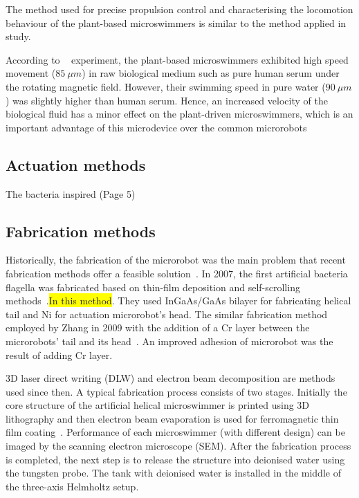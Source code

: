 \documentclass[12pt,a4paper,titlepage]{report}
\newcommand{\hilight}[1]{\colorbox{yellow}{#1}}
\begin{document}
The method used for precise propulsion control and characterising the locomotion behaviour of the 
plant-based microswimmers is similar to the method applied in \citeauthor{gao2013bioinspired} study.

According to \citeauthor{gao2013bioinspired} ~\citep{gao2013bioinspired} experiment, the plant-based 
microswimmers exhibited high speed movement ($85~\mu m$) in raw biological medium such as 
pure human serum under the rotating magnetic field. However, their swimming speed in pure water
 ($90~\mu m$) was slightly higher than human serum.   
 Hence, an increased velocity of the 
biological fluid has a minor effect on the plant-driven microswimmers, which is an important 
advantage of this microdevice over the common microrobots%







\subsection{Actuation methods} \label{actuation}
The bacteria inspired (Page 5)~\citep{peyer2013bio}



\subsection{Fabrication methods} \label{fabrication}

Historically, the fabrication of the microrobot was the main problem that recent fabrication methods 
offer a feasible solution~\citep{gao2013bioinspired}.
In 2007, the first artificial bacteria flagella was fabricated based on thin-film deposition and self-scrolling
 methods~\citep{qiu2014noncytotoxic}.\hilight{In this method}. They used InGaAs/GaAs bilayer for fabricating
helical tail and Ni for actuation microrobot\rq{}s head. The similar fabrication method employed by Zhang
 in 2009 with the addition of a Cr layer between the microrobots\rq{} tail and its head~\citep{qiu2014noncytotoxic}.
An improved adhesion of microrobot was the result of adding Cr layer. 

3D laser direct writing (DLW) and electron beam decomposition are methods used since then. A typical 
fabrication process consists of two stages. Initially the core structure of the artificial helical 
microswimmer is printed using 3D lithography and then electron beam evaporation is used for 
ferromagnetic thin film coating~\citep{tottori2013artificial}.  
Performance of each microswimmer (with different design) can be imaged by the scanning electron
 microscope (SEM). After the fabrication process is completed, the next step is to release the structure into 
deionised water using the tungsten probe. The tank with deionised water is installed in the middle of the 
three-axis Helmholtz setup. 
\end{document}
